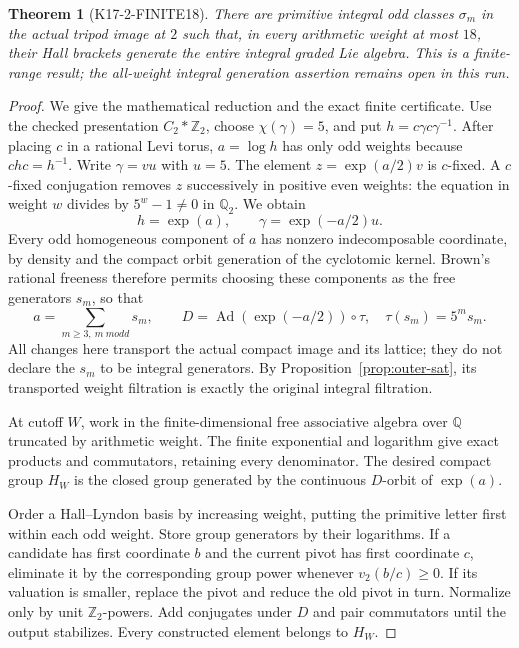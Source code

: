 \documentclass[11pt,a4paper]{article}
\newtheorem{theorem}{Theorem}[section]
\theoremstyle{definition}
\begin{document}
\begin{theorem}[K17-2-FINITE18]\label{thm:2-finite18}
There are primitive integral odd classes $\sigma_m$ in the actual
tripod image at $2$ such that, in every arithmetic weight at most
$18$, their Hall brackets generate the entire integral graded
Lie algebra. This is a finite-range result; the all-weight
integral generation assertion remains open in this run.
\end{theorem}

\begin{proof}
We give the mathematical reduction and the exact finite
certificate. Use the checked presentation $C_2*\mathbb Z_2$,
choose $\chi(\gamma)=5$, and put $h=c\gamma c\gamma^{-1}$.
After placing $c$ in a rational Levi torus, $a=\log h$ has only
odd weights because $chc=h^{-1}$. Write $\gamma=v u$ with
$u=5$. The element $z=\exp(a/2)v$ is $c$-fixed. A $c$-fixed
conjugation removes $z$ successively in positive even weights:
the equation in weight $w$ divides by $5^w-1\ne0$ in
$\mathbb Q_2$. We obtain
\[
 h=\exp(a),\qquad \gamma=\exp(-a/2)u.
\]
Every odd homogeneous component of $a$ has nonzero
indecomposable coordinate, by density and the compact orbit
generation of the cyclotomic kernel. Brown's rational freeness
therefore permits choosing these components as the free
generators $s_m$, so that
\[
 a=\sum_{m\ge3,\ m\ {
m odd}}s_m,\qquad
 D=\operatorname{Ad}(\exp(-a/2))\circ\tau,
 \quad\tau(s_m)=5^m s_m.
\]
All changes here transport the actual compact image and its
lattice; they do not declare the $s_m$ to be integral generators.
By Proposition~\ref{prop:outer-sat}, its transported weight
filtration is exactly the original integral filtration.

At cutoff $W$, work in the finite-dimensional free associative
algebra over $\mathbb Q$ truncated by arithmetic weight. The
finite exponential and logarithm give exact products and
commutators, retaining every denominator. The desired compact
group $H_W$ is the closed group generated by the continuous
$D$-orbit of $\exp(a)$.

Order a Hall--Lyndon basis by increasing weight, putting the
primitive letter first within each odd weight. Store group
generators by their logarithms. If a candidate has first
coordinate $b$ and the current pivot has first coordinate $c$,
eliminate it by the corresponding group power whenever
$v_2(b/c)\ge0$. If its valuation is smaller, replace the pivot
and reduce the old pivot in turn. Normalize only by unit
$\mathbb Z_2$-powers. Add conjugates under $D$ and pair
commutators until the output stabilizes. Every constructed
element belongs to $H_W$.


\end{proof}
\end{document}
